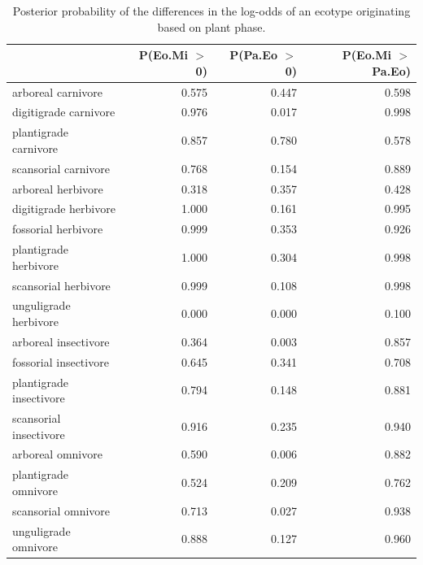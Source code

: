 \documentclass[12pt,letterpaper]{article}
\begin{document}
\begin{table}[ht]
  \centering
  \caption[Posterior probablity estimates of differences in origination by plant phase]{Posterior probability of the differences in the log-odds of an ecotype originating based on plant phase.} 
  \label{tab:origin_plant}
  \begin{tabular}{ l r r r }
    \hline
    & P(Eo.Mi $>$ 0) & P(Pa.Eo $>$ 0) & P(Eo.Mi $>$ Pa.Eo) \\ 
    \hline
    arboreal carnivore & 0.575 & 0.447 & 0.598 \\ 
    digitigrade carnivore & 0.976 & 0.017 & 0.998 \\ 
    plantigrade carnivore & 0.857 & 0.780 & 0.578 \\ 
    scansorial carnivore & 0.768 & 0.154 & 0.889 \\ 
    arboreal herbivore & 0.318 & 0.357 & 0.428 \\ 
    digitigrade herbivore & 1.000 & 0.161 & 0.995 \\ 
    fossorial herbivore & 0.999 & 0.353 & 0.926 \\ 
    plantigrade herbivore & 1.000 & 0.304 & 0.998 \\ 
    scansorial herbivore & 0.999 & 0.108 & 0.998 \\ 
    unguligrade herbivore & 0.000 & 0.000 & 0.100 \\ 
    arboreal insectivore & 0.364 & 0.003 & 0.857 \\ 
    fossorial insectivore & 0.645 & 0.341 & 0.708 \\ 
    plantigrade insectivore & 0.794 & 0.148 & 0.881 \\ 
    scansorial insectivore & 0.916 & 0.235 & 0.940 \\ 
    arboreal omnivore & 0.590 & 0.006 & 0.882 \\ 
    plantigrade omnivore & 0.524 & 0.209 & 0.762 \\ 
    scansorial omnivore & 0.713 & 0.027 & 0.938 \\ 
    unguligrade omnivore & 0.888 & 0.127 & 0.960 \\ 
    \hline
  \end{tabular}
\end{table}
\end{document}
